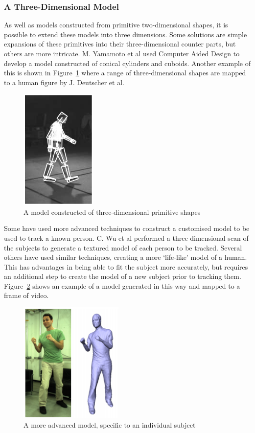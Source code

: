 \subsubsection{A Three-Dimensional Model}

As well as models constructed from primitive two-dimensional shapes, it is possible to extend these models into three dimensions. Some solutions are simple expansions of these primitives into their three-dimensional counter parts, but others are more intricate. M. Yamamoto et al used Computer Aided Design to develop a model constructed of conical cylinders and cuboids\cite{cadmodel}. Another example of this is shown in Figure~\ref{fig:3dmodelajd} where a range of three-dimensional shapes are mapped to a human figure by J. Deutscher et al.

\begin{figure}[H]
    \centering
    \includegraphics[height=6cm]{background/images/3dpolygon}

	\caption{A model constructed of three-dimensional primitive shapes\cite{stickfigure}}
	\label{fig:3dmodelajd}
\end{figure}

Some have used more advanced techniques to construct a customised model to be used to track a known person. C. Wu et al performed a three-dimensional scan of the subjects to generate a textured model of each person to be tracked\cite{capturystereopaper}. Several others have used similar techniques, creating a more `life-like' model of a human. This has advantages in being able to fit the subject more accurately, but requires an additional step to create the model of a new subject prior to tracking them. Figure~\ref{fig:3dtexturedmodel} shows an example of a model generated in this way and mapped to a frame of video.

\begin{figure}[H]
    \centering
    \includegraphics[height=6cm]{background/images/3dtexture}

	\caption{A more advanced model, specific to an individual subject\cite{capturystereopaper}}
	\label{fig:3dtexturedmodel}
\end{figure}
